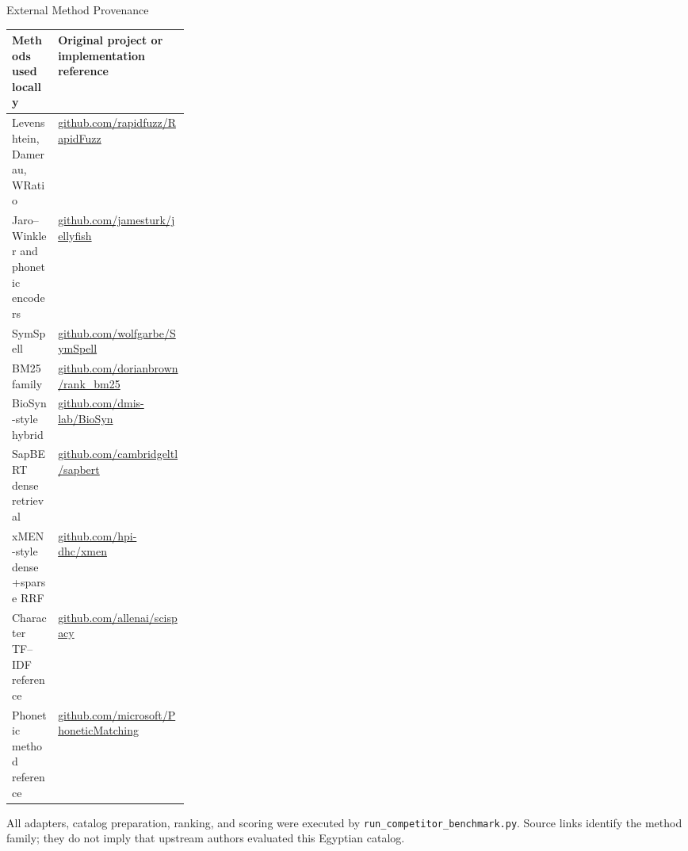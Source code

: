 \documentclass[aspectratio=169,10pt]{beamer}
\newcommand{\code}[1]{\texttt{#1}}
\begin{document}
\begin{frame}{External Method Provenance}
\scriptsize
\begin{tabularx}{\linewidth}{@{}L{0.26\linewidth}Y@{}}
\toprule
\textbf{Methods used locally} & \textbf{Original project or implementation reference} \\
\midrule
Levenshtein, Damerau, WRatio & \href{https://github.com/rapidfuzz/RapidFuzz}{github.com/rapidfuzz/RapidFuzz} \\
Jaro--Winkler and phonetic encoders & \href{https://github.com/jamesturk/jellyfish}{github.com/jamesturk/jellyfish} \\
SymSpell & \href{https://github.com/wolfgarbe/SymSpell}{github.com/wolfgarbe/SymSpell} \\
BM25 family & \href{https://github.com/dorianbrown/rank_bm25}{github.com/dorianbrown/rank\_bm25} \\
BioSyn-style hybrid & \href{https://github.com/dmis-lab/BioSyn}{github.com/dmis-lab/BioSyn} \\
SapBERT dense retrieval & \href{https://github.com/cambridgeltl/sapbert}{github.com/cambridgeltl/sapbert} \\
xMEN-style dense+sparse RRF & \href{https://github.com/hpi-dhc/xmen}{github.com/hpi-dhc/xmen} \\
Character TF--IDF reference & \href{https://github.com/allenai/scispacy}{github.com/allenai/scispacy} \\
Phonetic method reference & \href{https://github.com/microsoft/PhoneticMatching}{github.com/microsoft/PhoneticMatching} \\
\bottomrule
\end{tabularx}

\vspace{2mm}
All adapters, catalog preparation, ranking, and scoring were executed by
\code{run\_competitor\_benchmark.py}. Source links identify the method family;
they do not imply that upstream authors evaluated this Egyptian catalog.
\end{frame}
\end{document}
